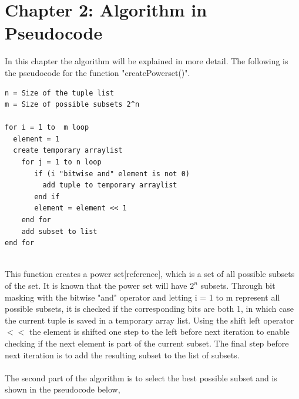 \documentclass{article}
\begin{document}
\section*{Chapter 2: Algorithm in Pseudocode}
In this chapter the algorithm will be explained in more detail. The following is the pseudocode for the function "createPowerset()". \newline

\begin{verbatim}
n = Size of the tuple list 	
m = Size of possible subsets 2^n

for i = 1 to  m loop
  element = 1  
  create temporary arraylist  
    for j = 1 to n loop
       if (i "bitwise and" element is not 0)
         add tuple to temporary arraylist
       end if
       element = element << 1
    end for
    add subset to list
end for
 
\end{verbatim}

\noindent This function creates a power set[reference], which is a set of all possible subsets of the set. It is known that the power set will have $2^n$ subsets. Through bit masking with the bitwise "and" operator and letting i = 1 to m represent all possible subsets, it is checked if the corresponding bits are both 1, in which case the current tuple is saved in a temporary array list. Using the shift left operator $<<$ the element is shifted one step to the left before next iteration to enable checking if the next element is part of the current subset. The final step before next iteration is to add the resulting subset to the list of subsets. \\ \\ 


The second part of the algorithm is to select the best possible subset and is shown in the pseudocode below,\\
\end{document}

